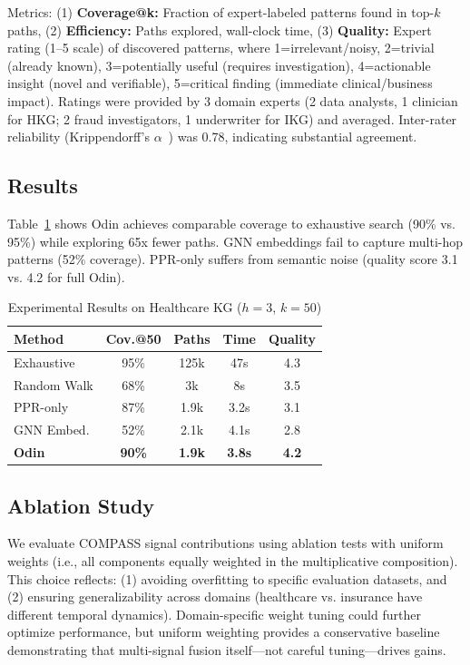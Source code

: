 \documentclass[10pt,twocolumn]{article}
\begin{document}
Metrics: (1) \textbf{Coverage@k:} Fraction of expert-labeled patterns found in top-$k$ paths, (2) \textbf{Efficiency:} Paths explored, wall-clock time, (3) \textbf{Quality:} Expert rating (1--5 scale) of discovered patterns, where 1=irrelevant/noisy, 2=trivial (already known), 3=potentially useful (requires investigation), 4=actionable insight (novel and verifiable), 5=critical finding (immediate clinical/business impact). Ratings were provided by 3 domain experts (2 data analysts, 1 clinician for HKG; 2 fraud investigators, 1 underwriter for IKG) and averaged. Inter-rater reliability (Krippendorff's $\alpha$~\cite{krippendorff2011computing}) was 0.78, indicating substantial agreement.

\subsection{Results}

Table~\ref{tab:results} shows Odin achieves comparable coverage to exhaustive search (90\% vs. 95\%) while exploring 65x fewer paths. GNN embeddings fail to capture multi-hop patterns (52\% coverage). PPR-only suffers from semantic noise (quality score 3.1 vs. 4.2 for full Odin).

\begin{table}[t]
\centering
\small
\caption{Experimental Results on Healthcare KG ($h=3$, $k=50$)}
\label{tab:results}
\begin{tabular}{@{}lcccc@{}}
\toprule
\textbf{Method} & \textbf{Cov.@50} & \textbf{Paths} & \textbf{Time} & \textbf{Quality} \\ \midrule
Exhaustive & 95\% & 125k & 47s & 4.3 \\
Random Walk & 68\% & 3k & 8s & 3.5 \\
PPR-only & 87\% & 1.9k & 3.2s & 3.1 \\
GNN Embed. & 52\% & 2.1k & 4.1s & 2.8 \\
\textbf{Odin} & \textbf{90\%} & \textbf{1.9k} & \textbf{3.8s} & \textbf{4.2} \\ \bottomrule
\end{tabular}
\end{table}

\subsection{Ablation Study}

We evaluate COMPASS signal contributions using ablation tests with uniform weights (i.e., all components equally weighted in the multiplicative composition). This choice reflects: (1) avoiding overfitting to specific evaluation datasets, and (2) ensuring generalizability across domains (healthcare vs. insurance have different temporal dynamics). Domain-specific weight tuning could further optimize performance, but uniform weighting provides a conservative baseline demonstrating that multi-signal fusion itself—not careful tuning—drives gains.
\end{document}
